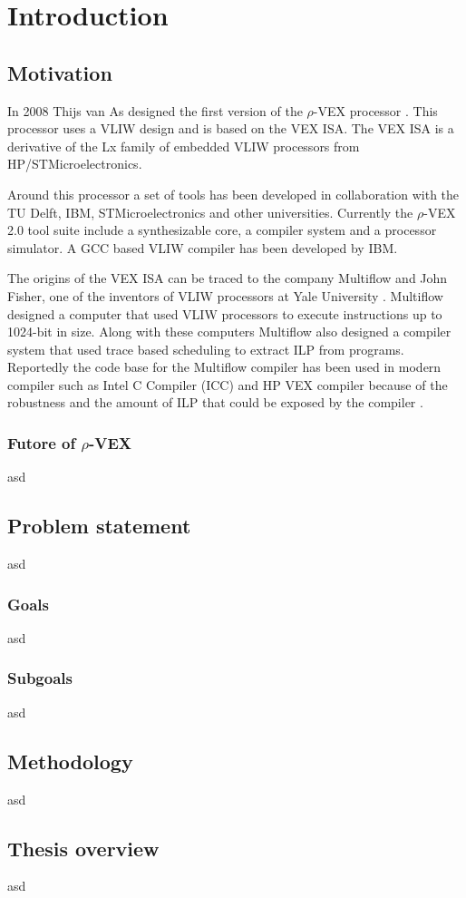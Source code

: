 \chapter{Introduction}
\section{Motivation}

In 2008 Thijs van As designed the first version of the $\rho$-VEX processor \cite{As:2008rt}. This processor uses a VLIW design and is based on the VEX ISA. The VEX ISA is a derivative of the Lx family of embedded VLIW processors \cite{854391} from HP/STMicroelectronics.

Around this processor a set of tools has been developed in collaboration with the TU Delft, IBM, STMicroelectronics and other universities. Currently the $\rho$-VEX 2.0 tool suite include a synthesizable core, a compiler system and a processor simulator. A GCC based VLIW compiler has been developed by IBM. 

The origins of the VEX ISA can be traced to the company Multiflow and John Fisher, one of the inventors of VLIW processors at Yale University \cite{Fisher:1983:VLI:1067651.801649}. Multiflow designed a computer that used VLIW processors to execute instructions up to 1024-bit in size. Along with these computers Multiflow also designed a compiler system that used trace based scheduling to extract ILP from programs. Reportedly the code base for the Multiflow compiler has been used in modern compiler such as Intel C Compiler (ICC) and HP VEX compiler because of the robustness and the amount of ILP that could be exposed by the compiler \cite{Lowney:1993qy}.


\subsection{Futore of $\rho$-VEX}
asd
\section{Problem statement}
asd
\subsection{Goals}
asd
\subsection{Subgoals}
asd
\section{Methodology}
asd
\section{Thesis overview}
asd


\acresetall
